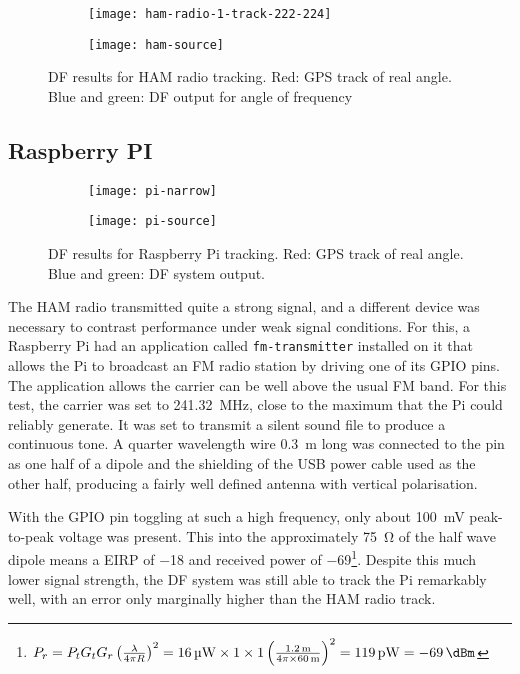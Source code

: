\begin{figure}
  \centering
  \begin{subfigure}[b]{0.77\textwidth}
    \centering
    \texttt{[image: ham-radio-1-track-222-224]}
  \end{subfigure}
  \begin{subfigure}[b]{0.22\textwidth}
    \centering
    \texttt{[image: ham-source]}
  \end{subfigure}
  \caption{DF results for HAM radio tracking. Red: GPS track of real angle. Blue and green: DF output for angle of frequency}
  \label{fig:field-trials:ham-source}
\end{figure}

\subsection{Raspberry PI}
\begin{figure}
  \centering
  \begin{subfigure}[b]{0.77\textwidth}
    \centering
    \texttt{[image: pi-narrow]}
  \end{subfigure}
  \begin{subfigure}[b]{0.22\textwidth}
    \centering
    \texttt{[image: pi-source]}
    \vspace{2em}
  \end{subfigure}
  \caption{DF results for Raspberry Pi tracking. Red: GPS track of real angle. Blue and green: DF system output.}
  \label{fig:field-trials:ham-source}
\end{figure}
The HAM radio transmitted quite a strong signal, and a different device was necessary to contrast performance under weak signal conditions. For this, a Raspberry Pi had an application called \lstinline{fm-transmitter} installed on it that allows the Pi to broadcast an FM radio station by driving one of its GPIO pins. The application allows the carrier can be well above the usual FM band. For this test, the carrier was set to \SI{241.32}{\mega\hertz}, close to the maximum that the Pi could reliably generate. It was set to transmit a silent sound file to produce a continuous tone. A quarter wavelength wire \SI{0.3}{\metre} long was connected to the pin as one half of a dipole and the shielding of the USB power cable used as the other half, producing a fairly well defined antenna with vertical polarisation.

With the GPIO pin toggling at such a high frequency, only about \SI{100}{\milli\volt} peak-to-peak voltage was present. This into the approximately \SI{75}{\ohm} of the half wave dipole means a EIRP of \SI{-18}{\dBm} and received power of \SI{-69}{\dBm}\footnote{\(P_r = P_t G_t G_r \left( \frac{\lambda}{4 \pi R} \right)^2 = \SI{16}{\micro\watt} \times 1 \times 1 \left( \frac{\SI{1.2}{\meter}}{4 \pi \times \SI{60}{\meter}} \right)^2 = \SI{119}{\pico\watt} = \SI{-69}{\dBm}\)}. Despite this much lower signal strength, the DF system was still able to track the Pi remarkably well, with an error only marginally higher than the HAM radio track.\\

